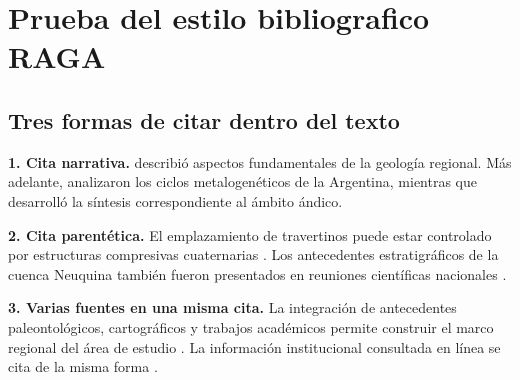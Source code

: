 \documentclass[11pt,a4paper,oneside]{report}
\begin{document}
\chapter{Prueba del estilo bibliografico RAGA}

\section*{Tres formas de citar dentro del texto}

\textbf{1. Cita narrativa.}
\textcite{groeber1946} describió aspectos fundamentales de la geología
regional. Más adelante, \textcite{angelelli1972} analizaron los ciclos
metalogenéticos de la Argentina, mientras que \textcite{groeber1953}
desarrolló la síntesis correspondiente al ámbito ándico.

\textbf{2. Cita parentética.}
El emplazamiento de travertinos puede estar controlado por estructuras
compresivas cuaternarias \parencite{alcacersanchez2020}. Los antecedentes
estratigráficos de la cuenca Neuquina también fueron presentados en reuniones
científicas nacionales \parencite{legarreta1981}.

\textbf{3. Varias fuentes en una misma cita.}
La integración de antecedentes paleontológicos, cartográficos y trabajos
académicos permite construir el marco regional del área de estudio
\parencite{weaver1931,ramos1981,ejemplotesis2025}. La información
institucional consultada en línea se cita de la misma forma
\parencite{inpres2019}.

\clearpage
\printbibliography[title={Referencias de prueba}]
\end{document}

